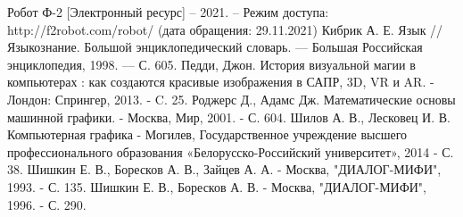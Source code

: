 \begin{thebibliography}{3}
Робот Ф-2 [Электронный ресурс] – 2021. – Режим доступа: http://f2robot.com/robot/ (дата обращения: 29.11.2021)
Кибрик А. Е. Язык // Языкознание. Большой энциклопедический словарь. — Большая Российская энциклопедия, 1998. — С. 605.
Педди, Джон. История визуальной магии в компьютерах : как создаются красивые изображения в САПР, 3D, VR и AR. - Лондон: Спрингер, 2013. - C. 25.
Роджерс Д., Адамс Дж. Математические основы машинной графики. - Москва, Мир, 2001. - С. 604.
Шилов А. В., Лесковец И. В. Компьютерная графика - Могилев, Государственное учреждение высшего профессионального образования «Белорусско-Российский университет», 2014 - С. 38.
Шишкин Е. В., Боресков А. В., Зайцев А. А. - Москва, "ДИАЛОГ-МИФИ", 1993. - С. 135.
Шишкин Е. В., Боресков А. В. - Москва, "ДИАЛОГ-МИФИ", 1996. - С. 290.
\end{thebibliography}